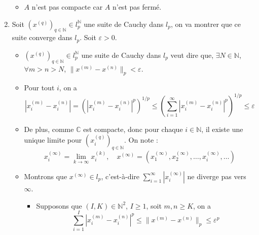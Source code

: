 \begin{solution}
\begin{enumerate}
\begin{itemize}
          \item $A$ n'est pas compacte car $A$ n'est pas fermé.

      \end{itemize}

    \item Soit $(x ^{(q)})_{q \in \mathbb{N}} \in l_p ^{\mathbb{N}}$ une suite de Cauchy dans $l_p$, on va montrer que ce suite converge dans $l_p$. Soit $\varepsilon > 0$.

      \begin{itemize}

          \item $(x ^{(q)})_{q \in \mathbb{N}} \in l_p ^{\mathbb{N}}$ une suite de Cauchy dans $l_p$ veut dire que, $\exists N \in \mathbb{N}$, $\forall m > n > N$, $\| x ^{(m)} - x ^{(n)} \|_p < \varepsilon$.

          \item Pour tout $i$, on a 
            \begin{equation}
              | x _{i} ^{(m)} -x _{i} ^{(n)} | = \left(|x _{i} ^{(m)} - x _{i} ^{(n)}| ^{p} \right) ^{ 1/p} \le \left( \sum_{i=1}^{\infty} | x ^{(m)} _{i} - x _{i} ^{(n)} | ^{p}\right) ^{1/p} \le \varepsilon
            \end{equation}

          \item De plus, comme $\mathbb{C}$ est compacte, donc pour chaque $i \in \mathbb{N}$, il existe une unique limite pour $(x _{i} ^{(q)}) _{q \in \mathbb{N}}$. On note :
            \begin{equation}
              x_i ^{(\infty)} = \underset{k \to \infty}{\lim} x _{i} ^{(k)}, \quad x ^{(\infty)} = \left( x_1 ^{(\infty)}, x_2 ^{(\infty)}, \dots, x_i ^{(\infty)}, \dots \right)
            \end{equation}
          \item Montrons que $x ^{(\infty)} \in l _p$, c'est-à-dire $\sum_{i=1}^{\infty}| x_i ^{(\infty)}|$ ne diverge pas vers $\infty$.
            \begin{itemize}

                \item Supposons que $(I,K) \in \mathbb{N} ^{2}$, $I \ge 1$, soit $m,n \ge K$, on a 
                  \begin{equation}
                   \sum_{i=1}^{I} |x_i ^{(m)} - x_i ^{(n)} | ^{p} \le \| x ^{(m)} - x ^{(n)}\| _{p} \le \varepsilon ^{p}
                  \end{equation}


\end{itemize}
\end{itemize}
\end{enumerate}
\end{solution}
